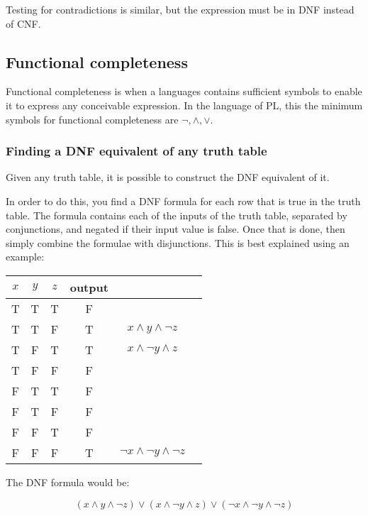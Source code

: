 Testing for contradictions is similar, but the expression must be in DNF instead
of CNF.

\subsection{Functional completeness}

Functional completeness is when a languages contains sufficient symbols to
enable it to express any conceivable expression. In the language of PL, this the
minimum symbols for functional completeness are $\neg, \wedge, \vee$.

\subsubsection{Finding a DNF equivalent of any truth table}

Given any truth table, it is possible to construct the DNF equivalent of it.

In order to do this, you find a DNF formula for each row that is true in the
truth table. The formula contains each of the inputs of the truth table,
separated by conjunctions, and negated if their input value is false. Once that
is done, then simply combine the formulae with disjunctions. This is best
explained using an example:

\begin{center}
	\begin{tabular}{|c c c|c|c|c|}
		\hline
		$x$ & $y$ & $z$ & output &\\ \hline
		T & T & T & F&\\
		T & T & F & T& $x \wedge y \wedge \neg z$\\
		T & F & T & T& $x \wedge \neg y \wedge z$\\
		T & F & F & F&\\
		F & T & T & F&\\
		F & T & F & F&\\
		F & F & T & F&\\
		F & F & F & T& $\neg x \wedge \neg y \wedge \neg z$\\ \hline
	\end{tabular}
\end{center}

The DNF formula would be:

\begin{dmath}
	{(x \wedge y \wedge \neg z) \vee (x \wedge \neg y \wedge z) \vee (\neg x \wedge \neg y \wedge \neg z)}
\end{dmath}

